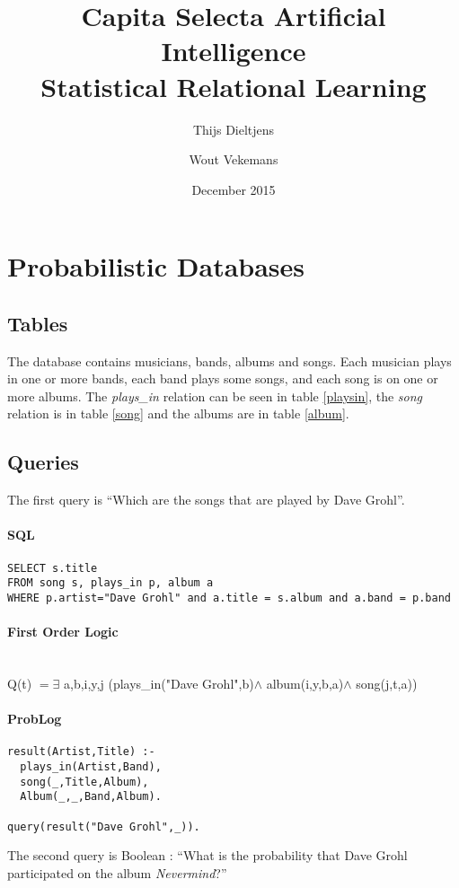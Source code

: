 \documentclass{article}
\title{Capita Selecta Artificial Intelligence \\ Statistical Relational Learning}
\author{Thijs Dieltjens \and Wout Vekemans }
\date{December 2015}
\begin{document}
\maketitle

\section{Probabilistic Databases}
\subsection{Tables}
The database contains musicians, bands, albums and songs. Each musician plays in one or more bands, each band plays some songs, and each song is on one or more albums. The \emph{plays\_in} relation can be seen in table \ref{playsin}, the \emph{song} relation is in table \ref{song} and the albums are in table \ref{album}.
\subsection{Queries}
The first query is ``Which are the songs that are played by Dave Grohl''.

\paragraph{SQL}
\begin{verbatim}
SELECT s.title 
FROM song s, plays_in p, album a
WHERE p.artist="Dave Grohl" and a.title = s.album and a.band = p.band
\end{verbatim}
\paragraph{First Order Logic} ~\\
Q(t) $= \exists $ a,b,i,y,j (plays\_in("Dave Grohl",b)$ \wedge$ album(i,y,b,a)$\wedge$ song(j,t,a))

\paragraph{ProbLog}
\begin{verbatim}
result(Artist,Title) :-
  plays_in(Artist,Band), 
  song(_,Title,Album),
  Album(_,_,Band,Album).
    
query(result("Dave Grohl",_)).

\end{verbatim}

The second query is Boolean : ``What is the probability that Dave Grohl participated on the album \emph{Nevermind}?''
\end{document}
